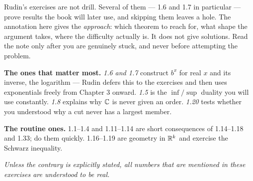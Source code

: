 
\begin{roadmap}
Rudin's exercises are not drill. Several of them --- 1.6 and 1.7 in particular
--- prove results the book will later use, and skipping them leaves a hole.
The annotation here gives the \emph{approach}: which theorem to reach for, what
shape the argument takes, where the difficulty actually is. It does not give
solutions. Read the note only after you are genuinely stuck, and never before
attempting the problem.

\medskip
\raggedright
\textbf{The ones that matter most.} \emph{1.6 and 1.7} construct $b^x$ for real
$x$ and its inverse, the logarithm --- Rudin defers this to the exercises and
then uses exponentials freely from Chapter 3 onward. \emph{1.5} is the $\inf/\sup$
duality you will use constantly. \emph{1.8} explains why $\mathbb{C}$ is never given an
order. \emph{1.20} tests whether you understood why a cut never has a largest
member.

\medskip
\textbf{The routine ones.} 1.1--1.4 and 1.11--1.14 are short consequences of
1.14--1.18 and 1.33; do them quickly. 1.16--1.19 are geometry in $\mathbb{R}^k$ and
exercise the Schwarz inequality.
\end{roadmap}

\noindent
\emph{Unless the contrary is explicitly stated, all numbers that are mentioned
in these exercises are understood to be real.}

